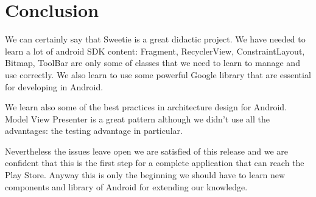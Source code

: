 
\section{Conclusion}
\label{sec:conclusion} 
We can certainly say that Sweetie is a great didactic project. We have needed to learn a lot of android SDK content: Fragment, RecyclerView, ConstraintLayout, Bitmap, ToolBar are only some of classes that we need to learn to manage and use correctly. We also learn to use some powerful Google library that are essential for developing in Android.

We learn also some of the best practices in architecture design for Android. Model View Presenter is a great pattern although we didn't use all the advantages: the testing advantage in particular.

Nevertheless the issues leave open we are satisfied of this release and we are confident that this is the first step for a complete application that can reach the Play Store. Anyway this is only the beginning we should have to learn new components and library of Android for extending our knowledge.
